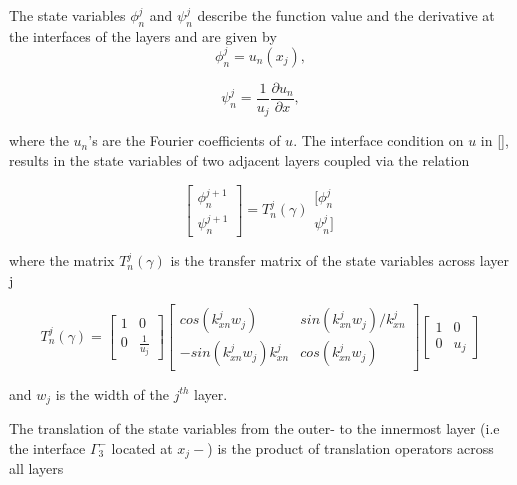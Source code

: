 The state variables $\phi_n^j$ and $\psi_n^j$ describe the function
value and the derivative at the interfaces of the layers and are given
by
\begin{equation}
\phi_n^j = u_n(x_j),
\end{equation}

\begin{equation}
\psi_n^j = \frac{1}{u_j} \frac{\partial{u_n}}{\partial{x}},
\end{equation}

where the $u_n$'s are the Fourier coefficients of $u$. The interface
condition on $u$ in \ref{}, results in the state variables of two
adjacent layers coupled via the relation

\begin{equation}
\left[ \begin{array}{ll} \phi_n^{j+1} \\ \psi_n^{j+1}
\end{array} \right] = T_n^j(\gamma)
\begin{array}{ll} [\phi_n^{j} \\ \psi_n^{j}] \end{array}
\end{equation}

where the matrix $T_n^j(\gamma)$ is the transfer matrix of the state
variables across layer j

\begin{equation}
T_n^j(\gamma) = \left[ \begin{array}{cc} 1 & 0 \\
0 & \frac{1}{u_j} \end{array} \right]
\left[ \begin{array}{cc}  cos(k_{xn}^j w_j) & sin(k_{xn}^j
 w_j)/k_{xn}^j \\
-sin(k_{xn}^j w_j) k_{xn}^j & cos(k_{xn}^j w_j) \end{array}
\right]\left[ \begin{array}{cc} 1 & 0 \\
0 & u_j \end{array} \right]
\end{equation}

and $w_j$ is the width of the $j^{th}$ layer.

The translation of the state variables from the outer- to the
innermost layer (i.e the interface $\Gamma_3^-$ located at $x_j-$) is
the product of translation operators across all layers

